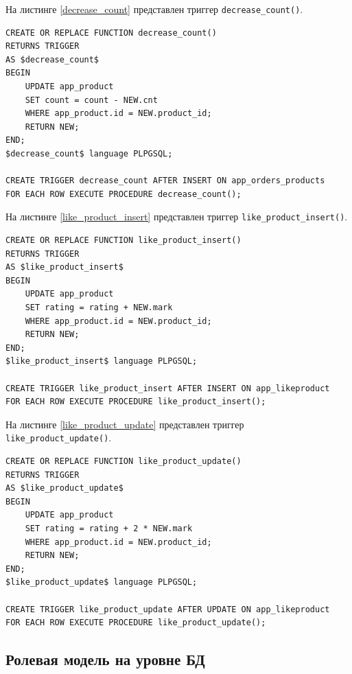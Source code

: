 На листинге \ref{decrease_count} представлен триггер \verb;decrease_count();.

\captionsetup{singlelinecheck = false, justification=raggedright}
\begin{lstlisting}[label=decrease_count,caption=Триггер на уменьшение количества товаров]
CREATE OR REPLACE FUNCTION decrease_count()
RETURNS TRIGGER
AS $decrease_count$
BEGIN
    UPDATE app_product 
    SET count = count - NEW.cnt
    WHERE app_product.id = NEW.product_id;
    RETURN NEW;
END;
$decrease_count$ language PLPGSQL;

CREATE TRIGGER decrease_count AFTER INSERT ON app_orders_products
FOR EACH ROW EXECUTE PROCEDURE decrease_count();
\end{lstlisting}

На листинге \ref{like_product_insert} представлен триггер \verb;like_product_insert();.

\captionsetup{singlelinecheck = false, justification=raggedright}
\begin{lstlisting}[label=like_product_insert,caption=Триггер на изменение рейтинга при добавлении оценки]
CREATE OR REPLACE FUNCTION like_product_insert()
RETURNS TRIGGER
AS $like_product_insert$
BEGIN
    UPDATE app_product 
    SET rating = rating + NEW.mark
    WHERE app_product.id = NEW.product_id;
    RETURN NEW;
END;
$like_product_insert$ language PLPGSQL;

CREATE TRIGGER like_product_insert AFTER INSERT ON app_likeproduct
FOR EACH ROW EXECUTE PROCEDURE like_product_insert();
\end{lstlisting}

На листинге \ref{like_product_update} представлен триггер \verb;like_product_update();.

\newpage

\captionsetup{singlelinecheck = false, justification=raggedright}
\begin{lstlisting}[label=like_product_update,caption=Триггер на обновление рейтинга при изменении оценки]
CREATE OR REPLACE FUNCTION like_product_update()
RETURNS TRIGGER
AS $like_product_update$
BEGIN
    UPDATE app_product
    SET rating = rating + 2 * NEW.mark
    WHERE app_product.id = NEW.product_id;
    RETURN NEW;
END;
$like_product_update$ language PLPGSQL;

CREATE TRIGGER like_product_update AFTER UPDATE ON app_likeproduct
FOR EACH ROW EXECUTE PROCEDURE like_product_update();
\end{lstlisting}

\subsection{Ролевая модель на уровне БД}


